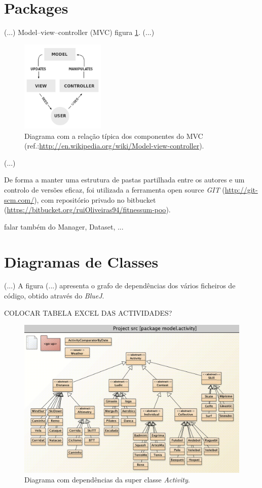 \documentclass[a4paper,10pt]{report}
\begin{document}
\section{Packages}
\label{sec:packages}
(...)
Model–view–controller (MVC) figura \ref{fig:mvc}.
(...)
\begin{figure}
\centering
\includegraphics[width=4cm]{MVC-Process.png}
\caption{Diagrama com a relação típica dos componentes do MVC (ref.:\url{http://en.wikipedia.org/wiki/Model-view-controller}).}
\label{fig:mvc}
\end{figure}
(...)

De forma a manter uma estrutura de pastas partilhada entre os autores e um controlo de versões eficaz, 
foi utilizada a ferramenta open source \emph{GIT} (\url{http://git-scm.com/}), 
com repositório privado no bitbucket (\url{https://bitbucket.org/ruiOliveiras94/fitnessum-poo}).

falar também do Manager, Dataset, ...

\section{Diagramas de Classes}
\label{sec:classes}
(...)
A figura (...) apresenta o grafo de dependências dos vários ficheiros de código, obtido através do \emph{BlueJ}.

COLOCAR TABELA EXCEL DAS ACTIVIDADES?

\begin{figure}
\centering
\includegraphics[width=\textwidth]{diagramaActivities.png}
\caption{Diagrama com dependências da super classe \emph{Activity}.}
\label{fig:activityDiagram}
\end{figure}
\end{document}

